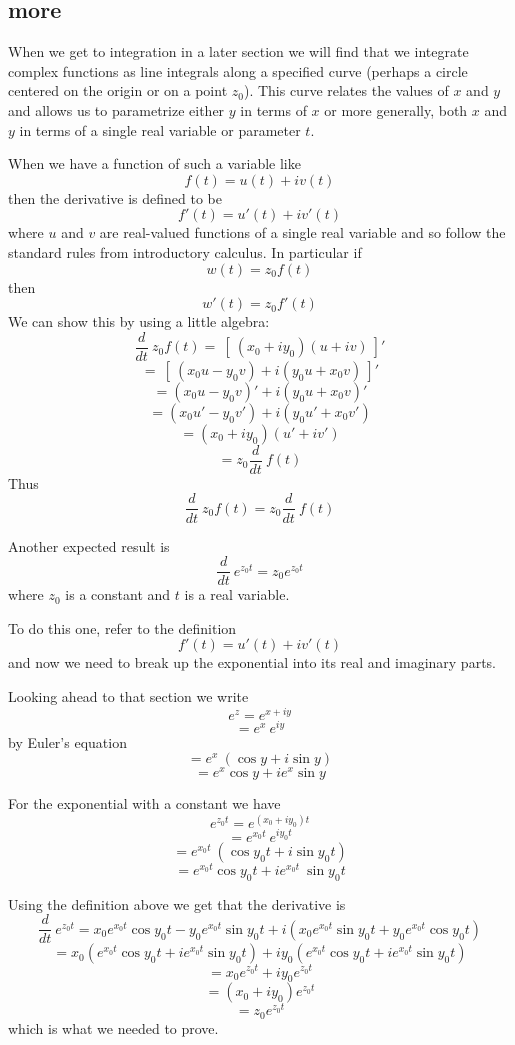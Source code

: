 \documentclass[11pt, oneside]{article}   	%
\begin{document}
\subsection*{more}
When we get to integration in a later section we will find that we integrate complex functions as line integrals along a specified curve (perhaps a circle centered on the origin or on a point $z_0$).  This curve relates the values of $x$ and $y$ and allows us to parametrize either $y$ in terms of $x$ or more generally, both $x$ and $y$ in terms of a single real variable or parameter $t$.

When we have a function of such a variable like
\[ f(t) = u(t) + i v(t) \]
then the derivative is defined to be
\[ f'(t) = u'(t) + i v'(t) \]
where $u$ and $v$ are real-valued functions of a single real variable and so follow the standard rules from introductory calculus.  In particular if
\[ w(t) = z_0 f(t) \]
then
\[ w'(t) = z_0 f'(t) \]
We can show this by using a little algebra:
\[ \frac{d}{dt} \ z_0 f(t) = \ [ \ (x_0 + i y_0) (u + iv) \ ]' \]
\[ = \ [ \ (x_0 u - y_0 v) + i (y_0 u + x_0 v) \ ]' \]
\[ = (x_0 u - y_0 v)' + i (y_0 u + x_0 v)' \]
\[ = (x_0 u' - y_0 v') + i (y_0 u' + x_0 v') \]
\[ = (x_0 + i y_0)(u' + iv') \]
\[ = z_0 \frac{d}{dt} \ f(t) \]
Thus
\[ \frac{d}{dt} \ z_0 f(t) = z_0 \frac{d}{dt} \ f(t) \]

Another expected result is
\[ \frac{d}{dt} \ e^{z_0 t} = z_0 e^{z_0 t} \]
where $z_0$ is a constant and $t$ is a real variable.

To do this one, refer to the definition
\[ f'(t) = u'(t) + i v'(t) \]
and now we need to break up the exponential into its real and imaginary parts.  

Looking ahead to that section we write
\[ e^z = e^{x + iy} \]
\[ = e^x \ e^{iy} \]
by Euler's equation
\[ = e^x \ (\cos y + i \sin y) \]
\[ = e^x \cos y + i e^x \sin y \]

For the exponential with a constant we have
\[ e^{z_0 t} = e^{(x_0 + iy_0) t} \]
\[ = e^{x_0t} \ e^{i y_0 t} \]
\[ = e^{x_0t} \ (\cos y_0 t + i \sin y_0 t) \]
\[ = e^{x_0t} \cos y_0 t + i e^{x_0t} \ \sin y_0 t \]

Using the definition above we get that the derivative is
\[ \frac{d}{dt} \ e^{z_0 t} = x_0 e^{x_0t} \cos y_0 t  - y_0 e^{x_0t} \sin y_0 t + i(x_0 e^{x_0t} \sin y_0 t + y_0 e^{x_0t} \cos y_0 t) \]
\[ = x_0(e^{x_0t} \cos y_0 t + i e^{x_0 t} \sin y_0 t) + i y_0(e^{x_0t} \cos y_0 t + i e^{x_0 t} \sin y_0 t) \]
\[ = x_0 e^{z_0 t} + i y_0 e^{z_0 t} \]
\[ = (x_0 + iy_0) e^{z_0 t} \]
\[ = z_0 e^{z_0 t} \]
which is what we needed to prove.
\end{document}
